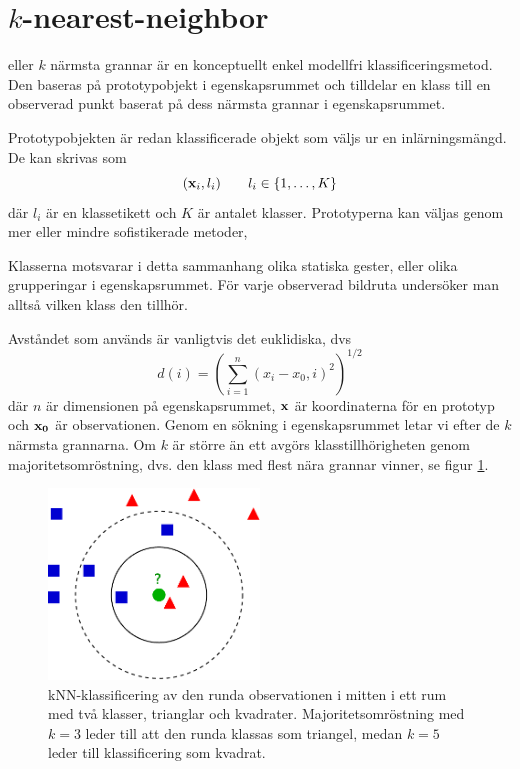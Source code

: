 \documentclass[../rapport_MVEX01-11-05]{subfiles}
\begin{document}
\section{$k$-nearest-neighbor}\label{sec:knn}

\knn eller $k$ närmsta grannar är en konceptuellt enkel modellfri
klassificeringsmetod.
Den baseras på prototypobjekt i egenskapsrummet och tilldelar en klass
till en observerad punkt baserat på dess närmsta grannar i egenskapsrummet.

Prototypobjekten är redan klassificerade objekt som väljs ur en inlärningsmängd.
De kan skrivas som
\begin{equation*}
    (\mathbf{x}_i, l_i)\qquad l_i \in \{ 1,\dotsc,K \}
\end{equation*}
där $l_i$ är en klassetikett och $K$ är antalet klasser.
Prototyperna kan väljas genom mer eller mindre sofistikerade metoder,


Klasserna motsvarar i detta sammanhang olika statiska gester,
eller olika grupperingar i egenskapsrummet. För
varje observerad bildruta undersöker man alltså vilken klass den tillhör.

Avståndet som används är vanligtvis det euklidiska, dvs
\begin{equation*}
    d(i) = \left(\sum_{i=1}^n(x_i-x_0,i)^2\right)^{1/2}
\end{equation*}
där $n$ är dimensionen på egenskapsrummet, $\mathbf{x}$ är koordinaterna för en
prototyp och $\mathbf{x_0}$ är observationen. Genom en sökning i
egenskapsrummet letar vi efter de $k$ närmsta grannarna. Om $k$ är större än ett
avgörs klasstillhörigheten genom majoritetsomröstning, dvs. den klass med flest
nära grannar vinner, se figur \ref{fig:knn-overview}.

\begin{figure}[!htb]
    \begin{center}
\includegraphics[width=0.5\textwidth]{bilder/KnnClassification}
    \end{center}
    \caption{kNN-klassificering av den runda observationen i mitten i ett rum
    med två klasser, trianglar och kvadrater. Majoritetsomröstning
    med $k=3$ leder till att den runda klassas som triangel, medan $k=5$ leder
    till klassificering som kvadrat.}
    \label{fig:knn-overview}
\end{figure}
\end{document}
